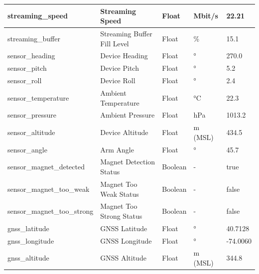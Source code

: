 \begin{table}[h!]
\begin{tabular}{|l|l|l|l|l|}
		streaming\_speed            & Streaming Speed             & Float              & Mbit/s        & 22.21                        \\ \hline
		streaming\_buffer           & Streaming Buffer Fill Level & Float              & \%            & 15.1                         \\ \hline
		sensor\_heading             & Device Heading              & Float              & °             & 270.0                        \\ \hline
		sensor\_pitch               & Device Pitch                & Float              & °             & 5.2                          \\ \hline
		sensor\_roll                & Device Roll                 & Float              & °             & 2.4                          \\ \hline
		sensor\_temperature         & Ambient Temperature         & Float              & °C            & 22.3                         \\ \hline
		sensor\_pressure            & Ambient Pressure            & Float              & hPa           & 1013.2                       \\ \hline
		sensor\_altitude            & Device Altitude             & Float              & m (MSL)       & 434.5                        \\ \hline
		sensor\_angle               & Arm Angle                   & Float              & °             & 45.7                         \\ \hline
		sensor\_magnet\_detected    & Magnet Detection Status     & Boolean            & -             & true                         \\ \hline
		sensor\_magnet\_too\_weak   & Magnet Too Weak Status      & Boolean            & -             & false                        \\ \hline
		sensor\_magnet\_too\_strong & Magnet Too Strong Status    & Boolean            & -             & false                        \\ \hline
		gnss\_latitude              & GNSS Latitude               & Float              & °             & 40.7128                      \\ \hline
		gnss\_longitude             & GNSS Longitude              & Float              & °             & -74.0060                     \\ \hline
		gnss\_altitude              & GNSS Altitude               & Float              & m (MSL)       & 344.8                        \\ \hline

\end{tabular}
\end{table}
